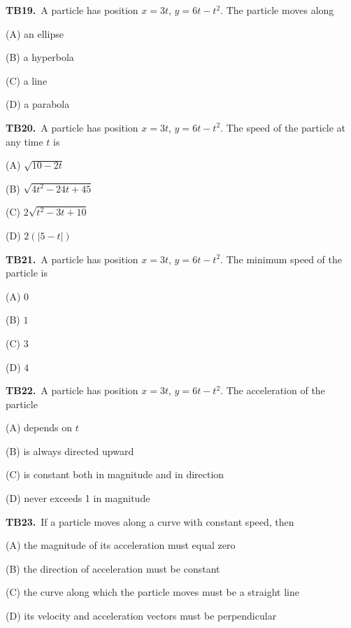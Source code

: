 \documentclass[11pt]{article}
\begin{document}
\bigskip\noindent\textbf{TB19.}\ A particle has position $x=3t$, $y=6t-t^2$. The particle moves along
\begin{list}{}{\setlength{\leftmargin}{3em}\setlength{\labelwidth}{2.5em}\setlength{\itemsep}{0pt}\setlength{\topsep}{2pt}}
\item[(A)] an ellipse
\item[(B)] a hyperbola
\item[(C)] a line
\item[(D)] a parabola
\end{list}

\bigskip\noindent\textbf{TB20.}\ A particle has position $x=3t$, $y=6t-t^2$. The speed of the particle at any time $t$ is
\begin{list}{}{\setlength{\leftmargin}{3em}\setlength{\labelwidth}{2.5em}\setlength{\itemsep}{0pt}\setlength{\topsep}{2pt}}
\item[(A)] $\sqrt{10-2t}$
\item[(B)] $\sqrt{4t^2-24t+45}$
\item[(C)] $2\sqrt{t^2-3t+10}$
\item[(D)] $2(|5-t|)$
\end{list}

\bigskip\noindent\textbf{TB21.}\ A particle has position $x=3t$, $y=6t-t^2$. The minimum speed of the particle is
\begin{list}{}{\setlength{\leftmargin}{3em}\setlength{\labelwidth}{2.5em}\setlength{\itemsep}{0pt}\setlength{\topsep}{2pt}}
\item[(A)] $0$
\item[(B)] $1$
\item[(C)] $3$
\item[(D)] $4$
\end{list}

\bigskip\noindent\textbf{TB22.}\ A particle has position $x=3t$, $y=6t-t^2$. The acceleration of the particle
\begin{list}{}{\setlength{\leftmargin}{3em}\setlength{\labelwidth}{2.5em}\setlength{\itemsep}{0pt}\setlength{\topsep}{2pt}}
\item[(A)] depends on $t$
\item[(B)] is always directed upward
\item[(C)] is constant both in magnitude and in direction
\item[(D)] never exceeds 1 in magnitude
\end{list}

\bigskip\noindent\textbf{TB23.}\ If a particle moves along a curve with constant speed, then
\begin{list}{}{\setlength{\leftmargin}{3em}\setlength{\labelwidth}{2.5em}\setlength{\itemsep}{0pt}\setlength{\topsep}{2pt}}
\item[(A)] the magnitude of its acceleration must equal zero
\item[(B)] the direction of acceleration must be constant
\item[(C)] the curve along which the particle moves must be a straight line
\item[(D)] its velocity and acceleration vectors must be perpendicular
\end{list}
\end{document}
